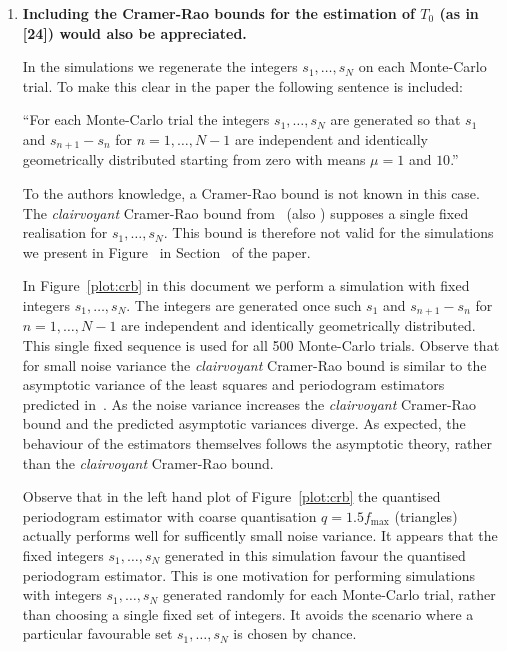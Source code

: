 \documentclass[a4paper,10pt]{article}
\begin{document}
\begin{enumerate}
\begin{enumerate}
\item \textbf{Including the Cramer-Rao bounds for the estimation of $T_0$
(as in [24]) would also be appreciated.}

In the simulations we regenerate the integers $s_1,\dots,s_N$ on each Monte-Carlo trial.  To make this clear in the paper the following sentence is included:

``For each Monte-Carlo trial the integers $s_1,\dots,s_N$ are generated so that $s_1$ and $s_{n+1} - s_n$ for $n=1,\dots,N-1$ are independent and identically geometrically distributed starting from zero with means $\mu=1$ and $10$.''
 
To the authors knowledge, a Cramer-Rao bound is not known in this case.   The \emph{clairvoyant} Cramer-Rao bound from~\cite{Sidiropoulos2005} (also \cite{726812,Clarkson2007}) supposes a single fixed realisation for $s_1,\dots,s_N$.  This bound is therefore not valid for the simulations we present in Figure~ in Section~ of the paper.  

In Figure~\ref{plot:crb} in this document we perform a simulation with fixed integers $s_1,\dots,s_N$. The integers are generated once such $s_1$ and $s_{n+1} - s_n$ for $n=1,\dots,N-1$ are independent and identically geometrically distributed.  This single fixed sequence is used for all 500 Monte-Carlo trials.  Observe that for small noise variance the \emph{clairvoyant} Cramer-Rao bound is similar to the asymptotic variance of the least squares and periodogram estimators predicted in~\cite{Quinn_sparse_noisy_SSP_2012,Quinn20013asilomar_period_est}.  As the noise variance increases the \emph{clairvoyant} Cramer-Rao bound and the predicted asymptotic variances diverge.  As expected, the behaviour of the estimators themselves follows the asymptotic theory, rather than the \emph{clairvoyant} Cramer-Rao bound.

Observe that in the left hand plot of Figure~\ref{plot:crb} the quantised periodogram estimator with coarse quantisation $q = 1.5 f_{\text{max}}$ (triangles) actually performs well for sufficently small noise variance.  It appears that the fixed integers $s_1,\dots,s_N$ generated in this simulation favour the quantised periodogram estimator.  This is one motivation for performing simulations with integers $s_1,\dots,s_N$ generated randomly for each Monte-Carlo trial, rather than choosing a single fixed set of integers.  It avoids the scenario where a particular favourable set $s_1,\dots,s_N$ is chosen by chance.



\end{enumerate}
\end{enumerate}
\end{document}
